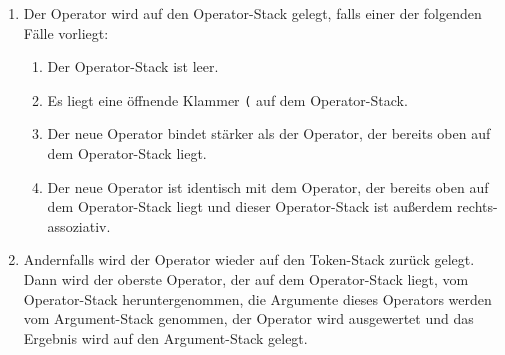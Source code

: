 \begin{enumerate}
\item Der Operator wird auf den Operator-Stack gelegt, falls einer der folgenden F\"alle
      vorliegt:
      \begin{enumerate}
      \item Der Operator-Stack ist leer.
      \item Es liegt eine \"offnende Klammer \texttt{(}
            auf dem Operator-Stack.
      \item Der neue Operator bindet st\"arker als der Operator, der bereits oben auf dem Operator-Stack liegt.
      \item Der neue Operator ist identisch mit dem Operator, der bereits oben auf dem Operator-Stack
            liegt und dieser Operator-Stack ist au{\ss}erdem rechts-assoziativ.
        
      \end{enumerate}
\item Andernfalls wird der Operator wieder auf den Token-Stack zur\"uck gelegt.
      Dann wird der oberste Operator, der auf dem Operator-Stack liegt,
      vom Operator-Stack heruntergenommen, die Argumente  dieses Operators werden vom
      Argument-Stack genommen, der Operator wird ausgewertet
      und das Ergebnis wird auf den Argument-Stack gelegt.
\end{enumerate}

